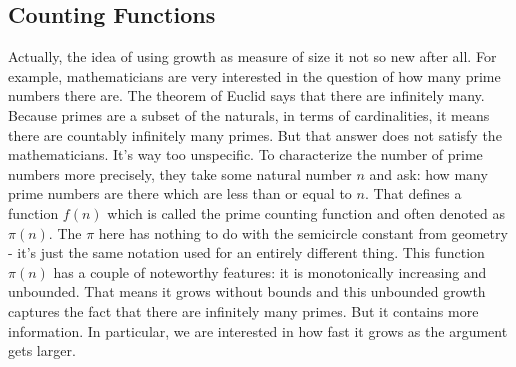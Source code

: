 \documentclass[12pt]{article}
\begin{document}


\subsection{Counting Functions}
Actually, the idea of using growth as measure of size it not so new after all. For example, mathematicians are very interested in the question of how many prime numbers there are. The theorem of Euclid says that there are infinitely many. Because primes are a subset of the naturals, in terms of cardinalities, it means there are countably infinitely many primes. But that answer does not satisfy the mathematicians. It's way too unspecific. To characterize the number of prime numbers more precisely, they take some natural number $n$ and ask: how many prime numbers are there which are less than or equal to $n$. That defines a function $f(n)$ which is called the prime counting function and often denoted as $\pi(n)$. The $\pi$ here has nothing to do with the semicircle constant from geometry - it's just the same notation used for an entirely different thing. This function $\pi(n)$ has a couple of noteworthy features: it is monotonically increasing and unbounded. That means it grows without bounds and this unbounded growth captures the fact that there are infinitely many primes. But it contains more information. In particular, we are interested in how fast it grows as the argument gets larger. 
\end{document}
